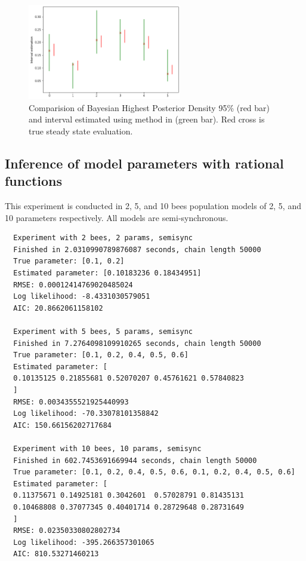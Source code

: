 \documentclass[12pt]{article}
\theoremstyle{definition}
\begin{document}
\begin{figure}[H]
  \centering
  \includegraphics[width=0.6\textwidth,keepaspectratio]{figures/interval_estimation.png}
  \caption{Comparision of Bayesian Highest Posterior Density 95\% (red bar) and interval
    estimated using method in \cite{hajnal2019data} (green bar). Red cross is
    true steady state evaluation.}
\end{figure}


\subsection{Inference of model parameters with rational functions}
This experiment is conducted in 2, 5, and 10 bees population models of 2, 5, and 10
parameters respectively. All models are semi-synchronous.\\
\begin{lstlisting}
  Experiment with 2 bees, 2 params, semisync
  Finished in 2.0310990789876087 seconds, chain length 50000
  True parameter: [0.1, 0.2]
  Estimated parameter: [0.10183236 0.18434951]
  RMSE: 0.00012414769020485024
  Log likelihood: -8.4331030579051
  AIC: 20.8662061158102

  Experiment with 5 bees, 5 params, semisync
  Finished in 7.2764098109910265 seconds, chain length 50000
  True parameter: [0.1, 0.2, 0.4, 0.5, 0.6]
  Estimated parameter: [
  0.10135125 0.21855681 0.52070207 0.45761621 0.57840823
  ]
  RMSE: 0.0034355521925440993
  Log likelihood: -70.33078101358842
  AIC: 150.66156202717684

  Experiment with 10 bees, 10 params, semisync
  Finished in 602.7453691669944 seconds, chain length 50000
  True parameter: [0.1, 0.2, 0.4, 0.5, 0.6, 0.1, 0.2, 0.4, 0.5, 0.6]
  Estimated parameter: [
  0.11375671 0.14925181 0.3042601  0.57028791 0.81435131
  0.10468808 0.37077345 0.40401714 0.28729648 0.28731649
  ]
  RMSE: 0.02350330802802734
  Log likelihood: -395.266357301065
  AIC: 810.53271460213

\end{lstlisting}
\end{document}
